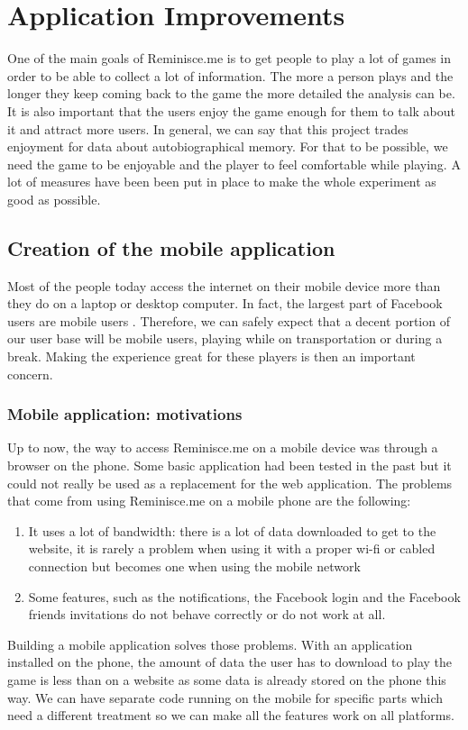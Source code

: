 \chapter{Application Improvements}
One of the main goals of Reminisce.me is to get people to play a lot of games in order to be able to collect a lot of information. The more a person plays and the longer they keep coming back to the game the more detailed the analysis can be. It is also important that the users enjoy the game enough for them to talk about it and attract more users. In general, we can say that this project trades enjoyment for data about autobiographical memory. For that to be possible, we need the game to be enjoyable and the player to feel comfortable while playing. A lot of measures have been been put in place to make the whole experiment as good as possible.
\section{Creation of the mobile application}
Most of the people today access the internet on their mobile device more than they do on a laptop or desktop computer. In fact, the largest part of Facebook users are mobile users \cite{mobileusage}. Therefore, we can safely expect that a decent portion of our user base will be mobile users, playing while on transportation or during a break. Making the experience great for these players is then an important concern.
\subsection{Mobile application: motivations}
Up to now, the way to access Reminisce.me on a mobile device was through a browser on the phone. Some basic application had been tested in the past but it could not really be used as a replacement for the web application. The problems that come from using Reminisce.me on a mobile phone are the following:
\begin{enumerate}
	\item It uses a lot of bandwidth: there is a lot of data downloaded to get to the website, it is rarely a problem when using it with a proper wi-fi or cabled connection but becomes one when using the mobile network
	\item Some features, such as the notifications, the Facebook login and the Facebook friends invitations do not behave correctly or do not work at all.
\end{enumerate}
Building a mobile application solves those problems. With an application installed on the phone, the amount of data the user has to download to play the game is less than on a website as some data is already stored on the phone this way. We can have separate code running on the mobile for specific parts which need a different treatment so we can make all the features work on all platforms.
